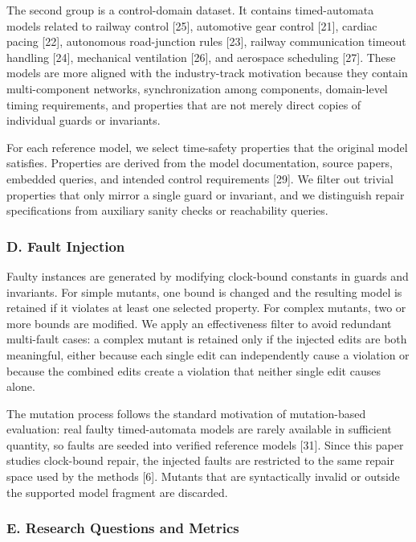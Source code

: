 \documentclass[
]{article}
\begin{document}
The second group is a control-domain dataset. It contains timed-automata
models related to railway control {[}25{]}, automotive gear control
{[}21{]}, cardiac pacing {[}22{]}, autonomous road-junction rules
{[}23{]}, railway communication timeout handling {[}24{]}, mechanical
ventilation {[}26{]}, and aerospace scheduling {[}27{]}. These models
are more aligned with the industry-track motivation because they contain
multi-component networks, synchronization among components, domain-level
timing requirements, and properties that are not merely direct copies of
individual guards or invariants.

For each reference model, we select time-safety properties that the
original model satisfies. Properties are derived from the model
documentation, source papers, embedded queries, and intended control
requirements {[}29{]}. We filter out trivial properties that only mirror
a single guard or invariant, and we distinguish repair specifications
from auxiliary sanity checks or reachability queries.

\subsubsection{D. Fault Injection}\label{d.-fault-injection}

Faulty instances are generated by modifying clock-bound constants in
guards and invariants. For simple mutants, one bound is changed and the
resulting model is retained if it violates at least one selected
property. For complex mutants, two or more bounds are modified. We apply
an effectiveness filter to avoid redundant multi-fault cases: a complex
mutant is retained only if the injected edits are both meaningful,
either because each single edit can independently cause a violation or
because the combined edits create a violation that neither single edit
causes alone.

The mutation process follows the standard motivation of mutation-based
evaluation: real faulty timed-automata models are rarely available in
sufficient quantity, so faults are seeded into verified reference models
{[}31{]}. Since this paper studies clock-bound repair, the injected
faults are restricted to the same repair space used by the methods
{[}6{]}. Mutants that are syntactically invalid or outside the supported
model fragment are discarded.

\subsubsection{E. Research Questions and
Metrics}\label{e.-research-questions-and-metrics}
\end{document}
